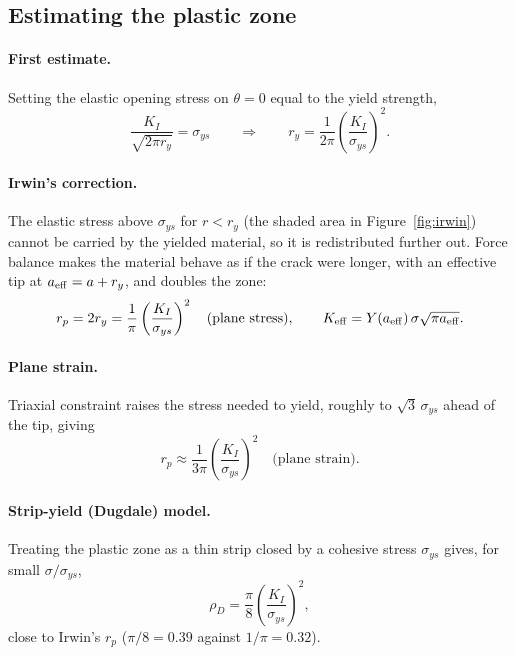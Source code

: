 \documentclass[11pt,a4paper]{article}
\begin{document}
\subsection{Estimating the plastic zone}
\paragraph{First estimate.} Setting the elastic opening stress on $\theta=0$ equal to the yield
strength,
\begin{equation}
  \frac{K_I}{\sqrt{2\pi r_y}} = \sigma_{ys}
  \qquad\Longrightarrow\qquad
  r_y = \frac{1}{2\pi}\left(\frac{K_I}{\sigma_{ys}}\right)^2 .
\end{equation}
\paragraph{Irwin's correction.} The elastic stress above $\sigma_{ys}$ for $r<r_y$ (the shaded area in
Figure~\ref{fig:irwin}) cannot be carried by the yielded material, so it is redistributed further out.
Force balance makes the material behave as if the crack were longer, with an effective tip at
$a_{\rm eff}=a+r_y$, and doubles the zone:
\begin{equation}
  r_p = 2r_y = \frac{1}{\pi}\left(\frac{K_I}{\sigma_{ys}}\right)^2 \quad\text{(plane stress)},
  \qquad
  K_{\rm eff} = Y(a_{\rm eff})\,\sigma\sqrt{\pi a_{\rm eff}} .
\end{equation}
\paragraph{Plane strain.} Triaxial constraint raises the stress needed to yield, roughly to
$\sqrt3\,\sigma_{ys}$ ahead of the tip, giving
\begin{equation}
  r_p \approx \frac{1}{3\pi}\left(\frac{K_I}{\sigma_{ys}}\right)^2 \quad\text{(plane strain)}.
\end{equation}
\paragraph{Strip-yield (Dugdale) model.} Treating the plastic zone as a thin strip closed by a
cohesive stress $\sigma_{ys}$ gives, for small $\sigma/\sigma_{ys}$,
\begin{equation}
  \rho_D = \frac{\pi}{8}\left(\frac{K_I}{\sigma_{ys}}\right)^2 ,
\end{equation}
close to Irwin's $r_p$ ($\pi/8 = 0.39$ against $1/\pi = 0.32$).
\end{document}
